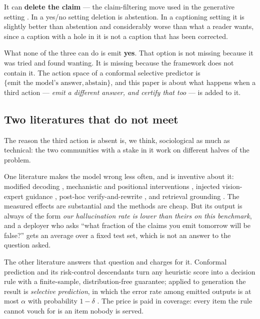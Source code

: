 \documentclass{article}
\theoremstyle{plain}
\theoremstyle{definition}
\theoremstyle{remark}
\begin{document}
It can \textbf{delete the claim} --- the claim-filtering move used in the generative
setting \citep{conflvlm,conformalfactuality}. In a yes/no setting deletion is abstention.
In a captioning setting it is slightly better than abstention and considerably worse than
what a reader wants, since a caption with a hole in it is not a caption that has been
corrected.

What none of the three can do is emit \textbf{yes}. That option is not missing because it
was tried and found wanting. It is missing because the framework does not contain it. The
action space of a conformal selective predictor is $\{\text{emit the model's answer},
\text{abstain}\}$, and this paper is about what happens when a third action ---
\emph{emit a different answer, and certify that too} --- is added to it.

\subsection{Two literatures that do not meet}

The reason the third action is absent is, we think, sociological as much as technical: the
two communities with a stake in it work on different halves of the problem.

One literature makes the model wrong less often, and is inventive about it: modified
decoding \citep{opera,vcd,degf}, mechanistic and positional interventions
\citep{attnlens,only,maskcd,causalgating,mcallava}, injected vision-expert guidance
\citep{marine}, post-hoc verify-and-rewrite \citep{woodpecker,lure,reverse}, and retrieval
grounding \citep{mkgrag,rule}. The measured effects are substantial and the methods are
cheap. But its output is always of the form \emph{our hallucination rate is lower than
theirs on this benchmark}, and a deployer who asks ``what fraction of the claims you emit
tomorrow will be false?'' gets an average over a fixed test set, which is not an answer to
the question asked.

The other literature answers that question and charges for it. Conformal prediction and its
risk-control descendants turn any heuristic score into a decision rule with a finite-sample,
distribution-free guarantee; applied to generation the result is \emph{selective prediction},
in which the error rate among emitted outputs is at most $\alpha$ with probability $1-\delta$
\citep{conformallm,conformalfactuality,conflvlm,onlineabstention}. The price is paid in
coverage: every item the rule cannot vouch for is an item nobody is served.
\end{document}
